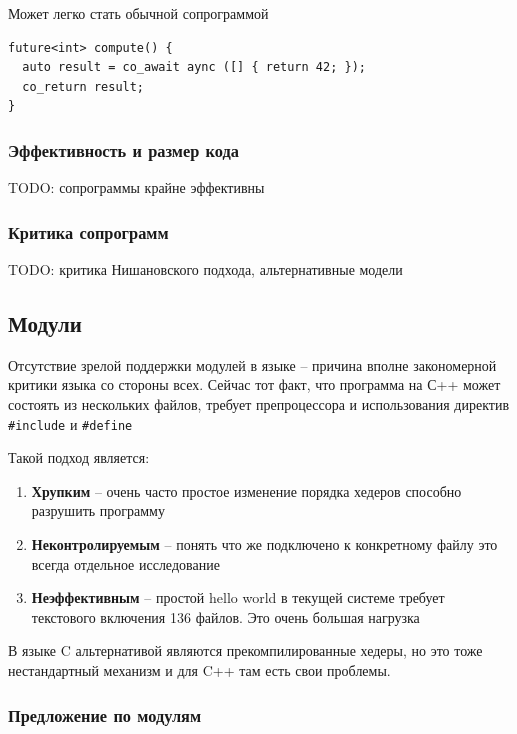 \documentclass[a4paper,12pt,oneside]{article}
\begin{document}
Может легко стать обычной сопрограммой

\begin{lstlisting}
future<int> compute() {
  auto result = co_await aync ([] { return 42; });
  co_return result;
}
\end{lstlisting}

\subsubsection{Эффективность и размер кода}

TODO: сопрограммы крайне эффективны

\subsubsection{Критика сопрограмм}

TODO: критика Нишановского подхода, альтернативные модели

\pagebreak
\subsection{Модули}\label{NewModules}

Отсутствие зрелой поддержки модулей в языке -- причина вполне закономерной критики языка со стороны всех. Сейчас тот факт, что программа на С++ может состоять из нескольких файлов, требует препроцессора и использования директив \lstinline!#include! и \lstinline!#define!

Такой подход является:

\begin{enumerate}
\item \textbf{Хрупким} -- очень часто простое изменение порядка хедеров способно разрушить программу
\item \textbf{Неконтролируемым} -- понять что же подключено к конкретному файлу это всегда отдельное исследование
\item \textbf{Неэффективным} -- простой hello world в текущей системе требует текстового включения 136 файлов. Это очень большая нагрузка
\end{enumerate}

В языке C альтернативой являются прекомпилированные хедеры, но это тоже нестандартный механизм и для C++ там есть свои проблемы.

\subsubsection{Предложение по модулям}
\end{document}
